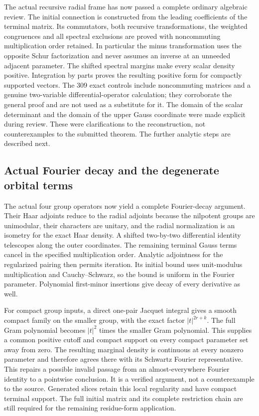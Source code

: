 \documentclass[11pt,a4paper]{article}
\theoremstyle{remark}
\begin{document}
The actual recursive radial frame has now passed a complete ordinary
algebraic review. The initial connection is constructed from the
leading coefficients of the terminal matrix. Its commutators,
both recursive transformations, the weighted congruences and all
spectral exclusions are proved with noncommuting multiplication
order retained. In particular the minus transformation uses the
opposite Schur factorization and never assumes an inverse at an
unneeded adjacent parameter. The shifted spectral margins make
every scalar density positive. Integration by parts proves the
resulting positive form for compactly supported vectors. The
$309$ exact controls include noncommuting matrices and a genuine
two-variable differential-operator calculation; they corroborate
the general proof and are not used as a substitute for it. The
domain of the scalar determinant and the domain of the upper
Gauss coordinate were made explicit during review. These were
clarifications to the reconstruction, not counterexamples to the
submitted theorem. The further analytic steps are described next.

\subsection{Actual Fourier decay and the degenerate orbital terms}

The actual four group operators now yield a complete Fourier-decay
argument. Their Haar adjoints reduce to the radial adjoints because
the nilpotent groups are unimodular, their characters are unitary,
and the radial normalization is an isometry for the exact Haar density.
A shifted two-by-two differential identity telescopes along the
outer coordinates. The remaining terminal Gauss terms cancel in
the specified multiplication order. Analytic adjointness for the
regularized pairing then permits iteration. Its initial bound uses
unit-modulus multiplication and Cauchy--Schwarz, so the bound is
uniform in the Fourier parameter. Polynomial first-minor insertions
give decay of every derivative as well.

For compact group inputs, a direct one-pair Jacquet integral gives
a smooth compact family on the smaller group, with the exact factor
$|t|^{2r+k}$. The full Gram polynomial becomes $|t|^2$ times the
smaller Gram polynomial. This supplies a common positive cutoff
and compact support on every compact parameter set away from zero.
The resulting marginal density is continuous at every nonzero
parameter and therefore agrees there with its Schwartz Fourier
representative. This repairs a possible invalid passage from an
almost-everywhere Fourier identity to a pointwise conclusion.
It is a verified argument, not a counterexample to the source.
Generated slices retain this local regularity and have compact
terminal support. The full initial matrix and its complete restriction
chain are still required for the remaining residue-form application.
\end{document}
